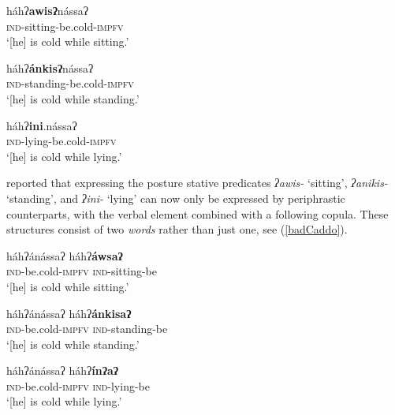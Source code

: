 \documentclass[output=paper,colorlinks,citecolor=brown,footheight=42pt]{langscibook}
\begin{document}
\begin{exe}

\ex \label{goodCaddo}

\begin{xlist}

\ex \gll háhʔ\textbf{awisʔ}nássaʔ \\
\textsc{ind}-sitting-be.cold-\textsc{impfv} \\
\glt `[he] is cold while sitting.' 

\ex \gll háhʔ\textbf{ánkisʔ}nássaʔ \\
\textsc{ind}-standing-be.cold-\textsc{impfv} \\
\glt `[he] is cold while standing.' 

\ex \gll háhʔ\textbf{ini}.nássaʔ \\
\textsc{ind}-lying-be.cold-\textsc{impfv} \\
\glt `[he] is cold while lying.' 

\end{xlist}

\end{exe}

\noindent
\citet{chafe76} reported that expressing the posture stative predicates \textit{ʔawis-} `sitting', \textit{ʔanikis-} `standing', and \textit{ʔini-} `lying' can now only be expressed by periphrastic counterparts, with the verbal element combined with a following copula. These structures consist of two \textit{words} rather than just one, see (\ref{badCaddo}).


\begin{exe}

\ex \label{badCaddo}

\begin{xlist}

\ex \gll háhʔánássaʔ háhʔ\textbf{áwsaʔ} \\
\textsc{ind}-be.cold-\textsc{impfv} \textsc{ind}-sitting-be \\
\glt `[he] is cold while sitting.' 

\ex \gll háhʔánássaʔ háhʔ\textbf{ánkisaʔ} \\
\textsc{ind}-be.cold-\textsc{impfv} \textsc{ind}-standing-be \\
\glt `[he] is cold while standing.' 

\ex \gll háhʔánássaʔ
háhʔ\textbf{\'{i}nʔaʔ} \\
\textsc{ind}-be.cold-\textsc{impfv} \textsc{ind}-lying-be \\
\glt `[he] is cold while lying.' 

\end{xlist}


\end{exe}
\end{document}
